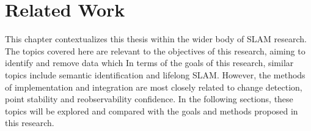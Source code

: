 \section{Related Work}
\label{sec:related_work}

This chapter contextualizes this thesis within the wider body of SLAM research. The topics covered here are relevant to the objectives of this research, aiming to identify and remove data which 
In terms of the goals of this research, similar topics include semantic identification and lifelong SLAM. However, the methods of implementation and integration are most closely related to change detection, point stability and reobservability confidence. In the following sections, these topics will be explored and compared with the goals and methods proposed in this research.

% 